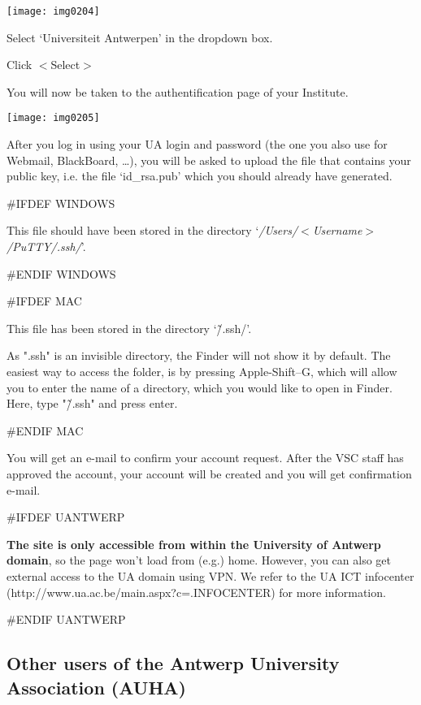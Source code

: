 \texttt{[image: img0204]}


Select `Universiteit Antwerpen' in the dropdown box.

Click $<$Select$>$



You will now be taken to the authentification page of your Institute.



\texttt{[image: img0205]}



After you log in using your UA login and password (the one you also use for Webmail, BlackBoard, \dots ), you will be asked to upload the file that contains your public key, i.e. the file `id\_rsa.pub' which you should already have generated.



\#IFDEF WINDOWS

This file should have been stored in the directory `\textit{/Users/$<$Username$>$/PuTTY/.ssh/}'.

\#ENDIF WINDOWS



\#IFDEF MAC

This file has been stored in the directory `\~/.ssh/'.

\textbf{} As ".ssh" is an invisible directory, the Finder will not show it by default. The easiest way to access the folder, is by pressing Apple-Shift--G, which will allow you to enter the name of a directory, which you would like to open in Finder. Here, type "\~/.ssh" and press enter.

\#ENDIF MAC



You will get an e-mail to confirm your account request. After the VSC staff has approved the account, your account will be created and you will get confirmation e-mail.



\#IFDEF UANTWERP

\textbf{The site is only accessible from within the University of Antwerp domain}, so the page won't load from (e.g.) home. However, you can also get external access to the UA domain using VPN. We refer to the UA ICT infocenter (http://www.ua.ac.be/main.aspx?c=.INFOCENTER) for more information.

\#ENDIF UANTWERP


\subsection{Other users of the Antwerp University Association (AUHA)}

